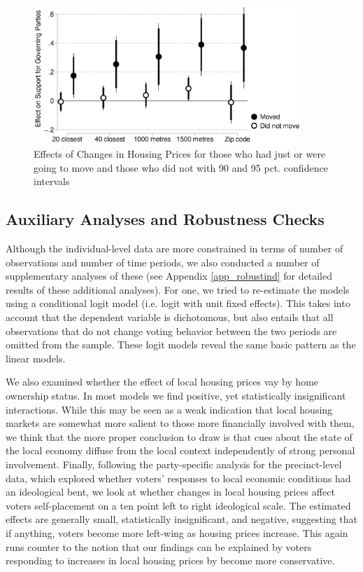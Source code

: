\documentclass[12pt,a4paper]{article}
\begin{document}
	
	
	\begin{figure}[htbp!]
		\includegraphics[width=0.9\textwidth]{../figures/moving.eps}
		\centering
		\caption{Effects of Changes in Housing Prices for those who had just or were going to move and those who did not with 90 and 95 pct. confidence intervals}\label{move}
	\end{figure}
	
	
	\subsection{Auxiliary Analyses and Robustness Checks}
	
	Although the individual-level data are more constrained in terms of number of observations and number of time periods, we also conducted a number of supplementary analyses of these (see Appendix \ref{app_robustind} for detailed results of these additional analyses). For one, we tried to re-estimate the models using a conditional logit model (i.e. logit with unit fixed effects). This takes into account that the dependent variable is dichotomous, but also entails that all observations that do not change voting behavior between the two periods are omitted from the sample. These logit models reveal the same basic pattern as the linear models. 
	
	We also examined whether the effect of local housing prices vay by home ownership status. In most models we find positive, yet statistically insignificant interactions. While this may be seen as a weak indication that local housing markets are somewhat more salient to those more financially involved with them, we think that the more proper conclusion to draw is that cues about the state of the local economy diffuse from the local context independently of strong personal involvement. 
	Finally, following the party-specific analysis for the precinct-level data, which explored whether voters’ responses to local economic conditions had an ideological bent, we look at whether changes in local housing prices affect voters self-placement on a ten point left to right ideological scale. The estimated effects are generally small, statistically insignificant, and negative, suggesting that if anything, voters become more left-wing as housing prices increase. This again runs counter to the notion that our findings can be explained by voters responding to increases in local housing prices by become more  conservative.
	
\end{document}
